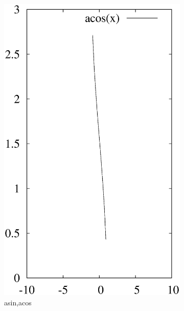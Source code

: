 \documentclass[letterpaper,showpacs,prb,preprint]{revtex4}
\begin{document}
\begin{figure}[ht]
\begin{subfigure}{0.3\textwidth}
\includegraphics [width=\textwidth]{acos.eps}
\caption{asin,acos}
\end{subfigure}
\begin{subfigure}{0.3\textwidth}

\end{subfigure}
\end{figure}
\end{document}
